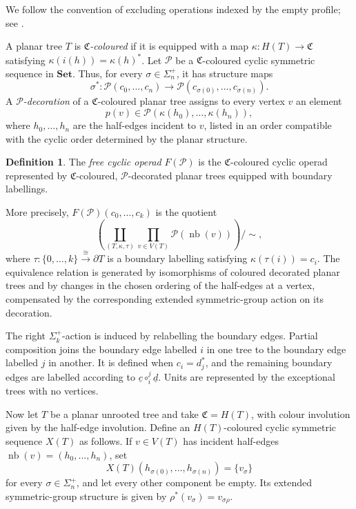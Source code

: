 \documentclass{amsart}
\newcommand{\Set}{\mathbf{Set}}
\theoremstyle{definition}
\newtheorem{definition}[theorem]{Definition}%
\numberwithin{equation}{section}
\begin{document}
We follow the convention of excluding operations indexed by the empty
profile; see \cite[Remark~4.3]{DCH}.

A planar tree $T$ is \emph{$\mathfrak C$-coloured} if it is equipped
with a map $\kappa\colon H(T)\to\mathfrak C$ satisfying
$\kappa(i(h))=\kappa(h)^*$. Let $\mathcal P$ be a $\mathfrak C$-coloured cyclic symmetric
sequence in $\Set$. Thus, for every $\sigma\in\Sigma_n^+$, it has
structure maps
\[
\sigma^*\colon
\mathcal P(c_0,\ldots,c_n)
\longrightarrow
\mathcal P(c_{\sigma(0)},\ldots,c_{\sigma(n)}).
\]
A \emph{$\mathcal P$-decoration} of a
$\mathfrak C$-coloured planar tree assigns to every vertex $v$ an
element
\[
p(v)\in
\mathcal P(\kappa(h_0),\ldots,\kappa(h_n)),
\]
where $h_0,\ldots,h_n$ are the half-edges incident to $v$, listed in
an order compatible with the cyclic order determined by the planar
structure.

\begin{definition}
\label{def: free cyclic operad}
The \emph{free cyclic operad} $F(\mathcal P)$ is the
$\mathfrak C$-coloured cyclic operad represented by
$\mathfrak C$-coloured, $\mathcal P$-decorated planar trees equipped
with boundary labellings.

More precisely, $F(\mathcal P)(c_0,\ldots,c_k)$ is the quotient
\[
\left(
\coprod_{(T,\kappa,\tau)}
\prod_{v\in V(T)}
\mathcal P(\operatorname{nb}(v))
\right)\bigg/\sim,
\]
where
$\tau\colon\{0,\ldots,k\}\xrightarrow{\cong}\partial T$
is a boundary labelling satisfying
$\kappa(\tau(i))=c_i$. The equivalence relation is generated by
isomorphisms of coloured decorated planar trees and by changes in
the chosen ordering of the half-edges at a vertex, compensated by
the corresponding extended symmetric-group action on its
decoration.

The right $\Sigma_k^+$-action is induced by relabelling the boundary
edges. Partial composition joins the boundary edge labelled $i$ in
one tree to the boundary edge labelled $j$ in another. It is defined
when $c_i=d_j^*$, and the remaining boundary edges are labelled
according to $\underline c\circ_i^j\underline d$. Units are
represented by the exceptional trees with no vertices.
\end{definition}

Now let $T$ be a planar unrooted tree and take
$\mathfrak C=H(T)$, with colour involution given by the half-edge
involution. Define an $H(T)$-coloured cyclic symmetric sequence
$X(T)$ as follows. If $v\in V(T)$ has incident half-edges
$\operatorname{nb}(v)=(h_0,\ldots,h_n)$, set
\[
X(T)(h_{\sigma(0)},\ldots,h_{\sigma(n)})
=
\{v_\sigma\}
\]
for every $\sigma\in\Sigma_n^+$, and let every other component be
empty. Its extended symmetric-group structure is given by
$\rho^*(v_\sigma)=v_{\sigma\rho}$.
\end{document}
